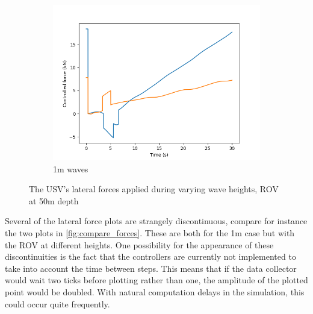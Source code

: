 \documentclass[class=article, crop=false]{standalone}
\begin{document}
\begin{figure}
\begin{subfigure}{0.65\textwidth}
        \includegraphics{scenario1/rov-50m/1.0m/usv_forces}
        \caption{1m waves}
        \label{fig:position_controlled_1m}
    \end{subfigure}
    \vfill
    \caption{The USV's lateral forces applied during varying wave heights, ROV at 50m depth}
    \label{fig:lateral_forces}
\end{figure}

Several of the lateral force plots are strangely discontinuous, compare for instance the two plots in \cref{fig:compare_forces}. These are both for the 1m case but with the ROV at different heights. One possibility for the appearance of these discontinuities is the fact that the controllers are currently not implemented to take into account the time between steps. This means that if the data collector would wait two ticks before plotting rather than one, the amplitude of the plotted point would be doubled. With natural computation delays in the simulation, this could occur quite frequently.
\end{document}
